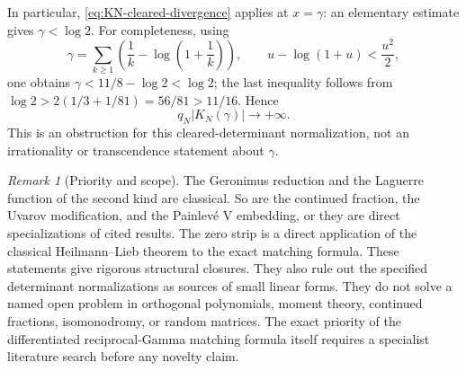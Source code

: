 \documentclass[11pt]{article}
\theoremstyle{definition}
\theoremstyle{remark}
\newtheorem{remark}[theorem]{Remark}
\begin{document}
In particular, \eqref{eq:KN-cleared-divergence} applies at \(x=\gamma\): an
elementary estimate gives \(\gamma<\log2\).  For completeness, using
\[
 \gamma=\sum_{k\geq1}\left(\frac1k-\log\left(1+\frac1k\right)\right),
 \qquad
 u-\log(1+u)<\frac{u^2}{2},
\]
one obtains \(\gamma<11/8-\log2<\log2\); the last inequality follows from
\(\log2>2(1/3+1/81)=56/81>11/16\).  Hence
\[
 q_N|K_N(\gamma)|\longrightarrow+\infty.
\]
This is an obstruction for this cleared-determinant normalization, not an
irrationality or transcendence statement about \(\gamma\).

\begin{remark}[Priority and scope]
The Geronimus reduction and the Laguerre function of the second kind are
classical.  So are the continued fraction, the Uvarov modification, and the
Painlev\'e V embedding, or they are direct specializations of cited results.
The zero strip is a direct application of the classical Heilmann--Lieb theorem
to the exact matching formula.  These statements give rigorous structural
closures.  They also rule out the specified determinant normalizations as
sources of small linear forms.
They do not solve a named open problem in orthogonal polynomials, moment
theory, continued fractions, isomonodromy, or random matrices.  The exact
priority of the differentiated reciprocal-Gamma matching formula itself
requires a specialist literature search before any novelty claim.
\end{remark}

%
%
%
%
%
%
%
\end{document}
